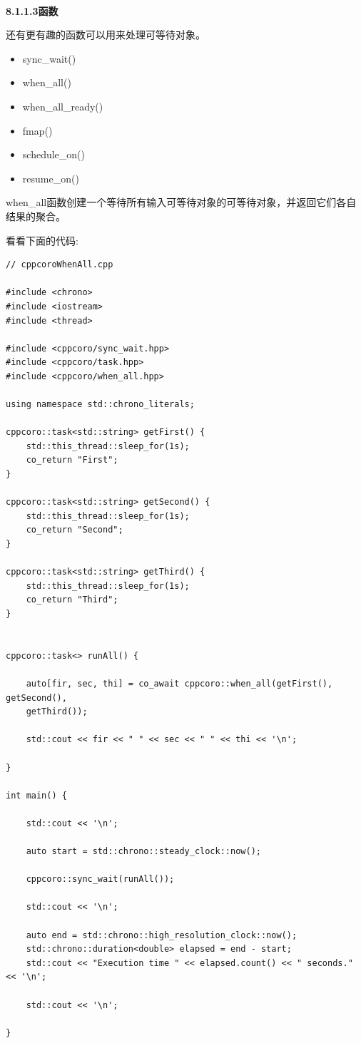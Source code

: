 \hspace*{\fill} \\ %
\noindent
\textbf{8.1.1.3\hspace{0.2cm}函数}

还有更有趣的函数可以用来处理可等待对象。

\begin{itemize}
\item 
sync\_wait()

\item 
when\_all()

\item 
when\_all\_ready()

\item 
fmap()

\item 
schedule\_on()

\item 
resume\_on()
\end{itemize}

when\_all函数创建一个等待所有输入可等待对象的可等待对象，并返回它们各自结果的聚合。

看看下面的代码:

\begin{lstlisting}[style=styleCXX]
// cppcoroWhenAll.cpp

#include <chrono>
#include <iostream>
#include <thread>

#include <cppcoro/sync_wait.hpp>
#include <cppcoro/task.hpp>
#include <cppcoro/when_all.hpp>

using namespace std::chrono_literals;

cppcoro::task<std::string> getFirst() {
	std::this_thread::sleep_for(1s);
	co_return "First";
}

cppcoro::task<std::string> getSecond() {
	std::this_thread::sleep_for(1s);
	co_return "Second";
}

cppcoro::task<std::string> getThird() {
	std::this_thread::sleep_for(1s);
	co_return "Third";
}


cppcoro::task<> runAll() {

	auto[fir, sec, thi] = co_await cppcoro::when_all(getFirst(), getSecond(),
	getThird());
	
	std::cout << fir << " " << sec << " " << thi << '\n';

}

int main() {

	std::cout << '\n';
	
	auto start = std::chrono::steady_clock::now();
	
	cppcoro::sync_wait(runAll());
	
	std::cout << '\n';
	
	auto end = std::chrono::high_resolution_clock::now();
	std::chrono::duration<double> elapsed = end - start;
	std::cout << "Execution time " << elapsed.count() << " seconds." << '\n';
	
	std::cout << '\n';

}
\end{lstlisting}

